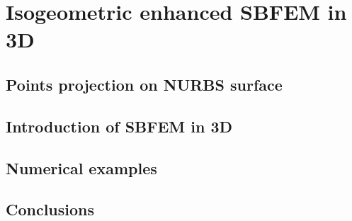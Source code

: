 
\chapter{Isogeometric enhanced SBFEM in 3D}


\section{Points projection on NURBS surface}





\section{Introduction of SBFEM in 3D}

\section{Numerical examples}



\section{Conclusions}